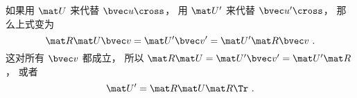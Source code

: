 如果用 $\mat U$ 来代替 $\bvec u\cross$， 用 $\mat U'$ 来代替 $\bvec u'\cross$， 那么上式变为
\begin{equation}
\mat R \mat U \bvec v = \mat U' \bvec v' = \mat U'\mat R\bvec v~.
\end{equation}
这对所有 $\bvec v$ 都成立， 所以 $\mat R \mat U = \mat U' \bvec v' = \mat U'\mat R$， 或者
\begin{equation}
\mat U' = \mat R \mat U \mat R\Tr~.
\end{equation}

